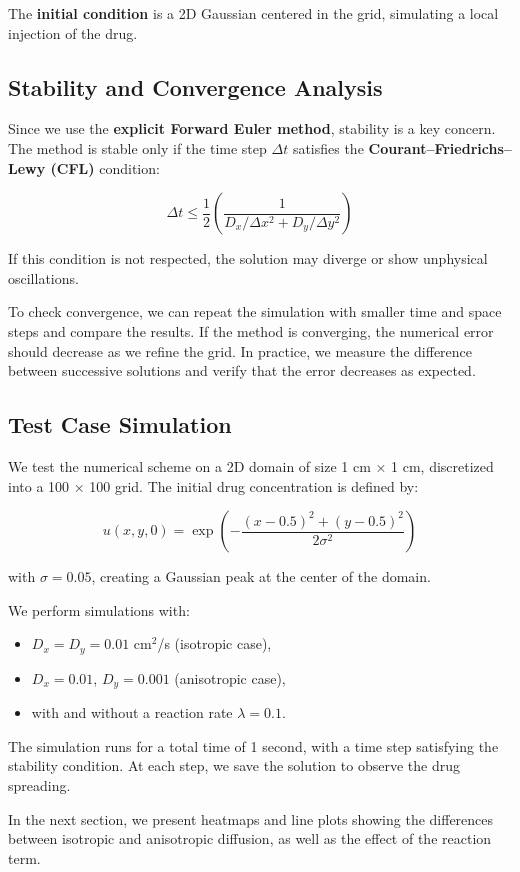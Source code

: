 \documentclass[11pt, a4paper]{article}
\begin{document}
The \textbf{initial condition} is a 2D Gaussian centered in the grid, simulating a local injection of the drug.

\subsection{Stability and Convergence Analysis}
Since we use the \textbf{explicit Forward Euler method}, stability is a key concern. The method is stable only if the time step \( \Delta t \) satisfies the \textbf{Courant–Friedrichs–Lewy (CFL)} condition:

\[
\Delta t \leq \frac{1}{2} \left( \frac{1}{D_x / \Delta x^2 + D_y / \Delta y^2} \right)
\]

If this condition is not respected, the solution may diverge or show unphysical oscillations.

To check convergence, we can repeat the simulation with smaller time and space steps and compare the results. If the method is converging, the numerical error should decrease as we refine the grid. In practice, we measure the difference between successive solutions and verify that the error decreases as expected.

\subsection{Test Case Simulation}
We test the numerical scheme on a 2D domain of size 1 cm × 1 cm, discretized into a 100 × 100 grid. The initial drug concentration is defined by:

\[
u(x, y, 0) = \exp\left( -\frac{(x - 0.5)^2 + (y - 0.5)^2}{2\sigma^2} \right)
\]

with \( \sigma = 0.05 \), creating a Gaussian peak at the center of the domain.

We perform simulations with:
\begin{itemize}
    \item \( D_x = D_y = 0.01 \) cm\(^2\)/s (isotropic case),
    \item \( D_x = 0.01 \), \( D_y = 0.001 \) (anisotropic case),
    \item with and without a reaction rate \( \lambda = 0.1 \).
\end{itemize}

The simulation runs for a total time of 1 second, with a time step satisfying the stability condition. At each step, we save the solution to observe the drug spreading.

In the next section, we present heatmaps and line plots showing the differences between isotropic and anisotropic diffusion, as well as the effect of the reaction term.
\end{document}
